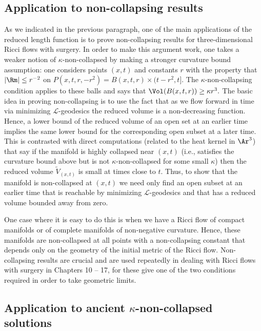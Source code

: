 \subsection{Application to non-collapsing results}

As we indicated in the previous paragraph, one of the main
applications of the reduced length function is to prove
non-collapsing results for three-dimensional Ricci flows with
surgery. In order to make this  argument work, one takes a weaker
notion of $\kappa$-non-collapsed by
making a stronger curvature bound assumption: one considers
 points $(x,t)$ and constants $r$ with the property that $|\Rm|\le r^{-2}$ on
$P(x,t,r,-r^2)=B(x,t,r)\times (t-r^2,t]$. The
$\kappa$-non-collapsing condition applies to these balls and says
that $\Vol(B(x,t,r))\ge \kappa r^3.$ The basic idea in proving
non-collapsing is to use the fact that as we flow forward in time
via minimizing ${\mathcal L}$-geodesics the reduced volume is a
non-decreasing function. Hence, a lower bound of the reduced volume
of an open set at an earlier time implies the same lower bound for
the corresponding open subset at a later time. This is contrasted
with direct computations (related to the heat kernel in $\Ar^3$)
that say if the manifold is highly collapsed near $(x,t)$ (i.e.,
satisfies the curvature bound above but is not
$\kappa$-non-collapsed for some small $\kappa$) then the reduced
volume $\widetilde V_{(x,t)}$ is small at times close to $t$. Thus,
to show that the manifold is non-collapsed at $(x,t)$ we need only
find an open subset at an earlier time that is reachable by
minimizing ${\mathcal L}$-geodesics and that has a reduced volume
bounded away from zero.




One case where it is easy to do this is when we have a Ricci flow of
compact manifolds or of complete manifolds of non-negative
curvature. Hence, these manifolds are non-collapsed at all points
with a  non-collapsing constant that depends only on the geometry of
the initial metric of the Ricci flow. Non-collapsing results are
crucial and are used repeatedly in dealing with Ricci flows with
surgery in Chapters 10 -- 17, for these give one of the two
conditions required in order to take geometric limits.


\subsection{Application to ancient $\kappa$-non-collapsed solutions}

